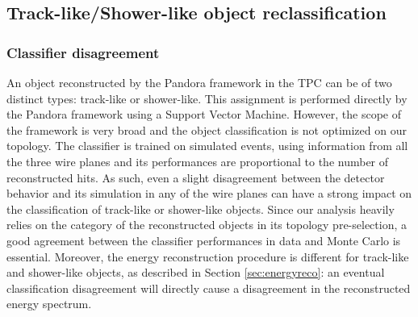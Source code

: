 \subsection{Track-like/Shower-like object reclassification}\label{sec:reclass}
\subsubsection{Classifier disagreement}
An object reconstructed by the Pandora framework in the TPC can be of two distinct types: track-like or shower-like. This assignment is performed directly by the Pandora framework using a Support Vector Machine. However, the scope of the framework is very broad and the object classification is not optimized on our topology. 
The classifier is trained on simulated events, using information from all the three wire planes and its performances are proportional to the number of reconstructed hits. As such, even a slight disagreement between the detector behavior and its simulation in any of the wire planes can have a strong impact on the classification of track-like or shower-like objects. 
Since our analysis heavily relies on the category of the reconstructed objects in its topology pre-selection, a good agreement between the classifier performances in data and Monte Carlo is essential.
Moreover, the energy reconstruction procedure is different for track-like and shower-like objects, as described in Section \ref{sec:energyreco}: an eventual classification disagreement will directly cause a disagreement in the reconstructed energy spectrum.


